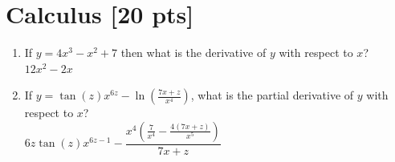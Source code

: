 \documentclass[a4paper]{article}
\theoremstyle{definition}
\newenvironment{soln}{
    \leavevmode\color{blue}\ignorespaces
}{}
\begin{document}
\section{Calculus [20 pts]}
\begin{enumerate}
	\item 	If $y = 4x^3 - x^2 + 7$ then what is the derivative of $y$ with respect to $x$?\\
	\begin{soln}  $12x^2  - 2x$ \end{soln}
	\item If $y = \tan(z)x^{6z} - \ln(\frac{7x + z}{x^{4}})$, what is the partial derivative of $y$ with respect to $x$?\\
	\begin{soln}  $6{z}\tan({z})x^{6z-1}-\dfrac{x^4\left(\frac{7}{x^4}-\frac{4\left(7x+z\right)}{x^5}\right)}{7x+z}$ \end{soln}
\end{enumerate}
\end{document}

